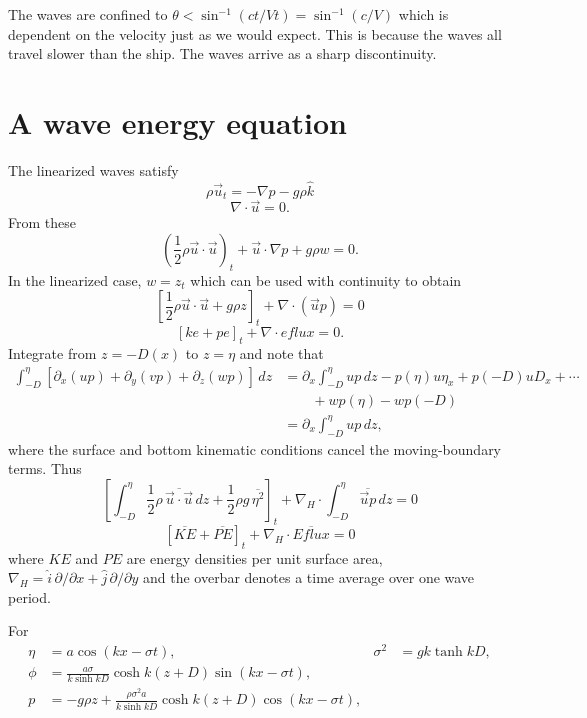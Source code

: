 
The waves are confined to $\theta<\sin^{-1}(ct/Vt)=\sin^{-1}(c/V)$ which is dependent on the velocity just as
we would expect. This is because the waves all travel slower than the ship. The waves
arrive as a sharp discontinuity.


\section{A wave energy equation}

The linearized waves satisfy
\[
	\rho\vec u_t=-\nabla p-g\rho\hat k
\]
\[
	\nabla\cdot\vec u=0.
\]
From these
\[
	\left(\frac12\rho\vec u\cdot\vec u\right)_t
	+\vec u\cdot\nabla p+g\rho w=0.
\]
In the linearized case, $w=z_t$ which can be used with continuity to obtain
\[
	\left[\frac12\rho\vec u\cdot\vec u+g\rho z\right]_t
	+\nabla\cdot(\vec u p)=0
\]
\[
	[ke+pe]_t+\nabla\cdot eflux=0.
\]
Integrate from $z=-D(x)$ to $z=\eta$ and note that
\begin{align*}
	\int_{-D}^{\eta}
	[\partial_x(up)+\partial_y(vp)+\partial_z(wp)]\,dz
	 & =\partial_x\int_{-D}^{\eta}up\,dz
	-p(\eta)u\eta_x+p(-D)uD_x+\cdots      \\
	 & \qquad +wp(\eta)-wp(-D)            \\
	 & =\partial_x\int_{-D}^{\eta}up\,dz,
\end{align*}
where the surface and bottom kinematic conditions cancel the moving-boundary terms.
Thus
\[
	\left[
		\int_{-D}^{\eta}\frac12\rho\,\overline{\vec u\cdot\vec u}\,dz
		+\frac12\rho g\,\overline{\eta^2}
		\right]_t
	+\nabla_H\cdot\int_{-D}^{\eta}\overline{\vec u p}\,dz=0
\]
\[
	[\overline{KE}+\overline{PE}]_t+\nabla_H\cdot\overline{Eflux}=0
\]
where $KE$ and $PE$ are energy densities per unit surface area,
$\nabla_H=\hat i\,\partial/\partial x+\hat j\,\partial/\partial y$ and the overbar
denotes a time average over one wave period.

For
\begin{align*}
	\eta & =a\cos(kx-\sigma t),
	     & \sigma^2                                                 & =gk\tanh kD, \\
	\phi & =\frac{a\sigma}{k\sinh kD}\cosh k(z+D)\sin(kx-\sigma t),                \\
	p    & =-g\rho z+\frac{\rho\sigma^2a}{k\sinh kD}
	\cosh k(z+D)\cos(kx-\sigma t),
\end{align*}

